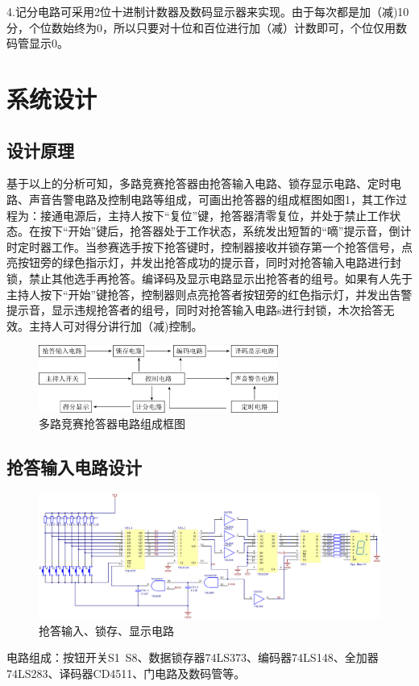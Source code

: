 \documentclass{../source/Experiment}
\begin{document}
        4.记分电路可采用2位十进制计数器及数码显示器来实现。由于每次都是加（减)10分，个位数始终为0，所以只要对十位和百位进行加（减）计数即可，个位仅用数码管显示0。
    \section{系统设计}
        \subsection{设计原理}
            基于以上的分析可知，多路竞赛抢答器由抢答输入电路、锁存显示电路、定时电路、声音告警电路及控制电路等组成，可画出抢答器的组成框图如图1，其工作过程为：接通电源后，主持人按下“复位”键，抢答器清零复位，并处于禁止工作状态。在按下“开始”键后，抢答器处于工作状态，系统发出短暂的“嘀”提示音，倒计时定时器工作。当参赛选手按下抢答键时，控制器接收并锁存第一个抢答信号，点亮按钮旁的绿色指示灯，并发出抢答成功的提示音，同时对抢答输入电路进行封锁，禁止其他选手再抢答。编译码及显示电路显示出抢答者的组号。如果有人先于主持人按下“开始”键抢答，控制器则点亮抢答者按钮旁的红色指示灯，并发出告警提示音，显示违规抢答者的组号，同时对抢答输入电路s进行封锁，木次拾答无效。主持人可对得分讲行加（减)控制。
            \begin{figure}[H]
                \centering
                \includegraphics[width = 0.7\textwidth]{pic/思路.png}
                \caption{多路竞赛抢答器电路组成框图}
            \end{figure}
        \subsection{抢答输入电路设计}
            \begin{figure}[H]
                \centering
                \includegraphics[width = 1\textwidth]{pic/P01.png}
                \caption{抢答输入、锁存、显示电路}
            \end{figure}
            电路组成：按钮开关S1~S8、数据锁存器74LS373、编码器74LS148、全加器74LS283、译码器CD4511、门电路及数码管等。
\end{document}
